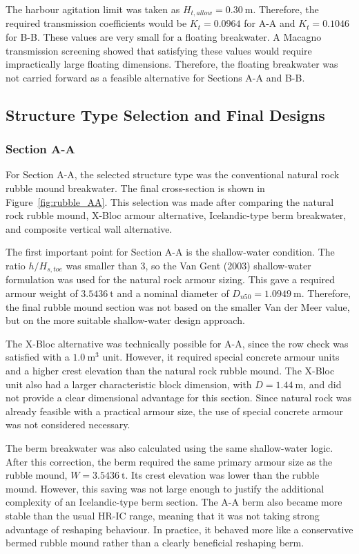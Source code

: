\documentclass[a4paper, 11pt]{article}
\begin{document}
The harbour agitation limit was taken as \(H_{t,allow}=0.30~\mathrm{m}\). Therefore, the required transmission coefficients would be \(K_t=0.0964\) for A-A and \(K_t=0.1046\) for B-B. These values are very small for a floating breakwater. A Macagno transmission screening showed that satisfying these values would require impractically large floating dimensions. Therefore, the floating breakwater was not carried forward as a feasible alternative for Sections A-A and B-B.


\subsection{Structure Type Selection and Final Designs}

\subsubsection{Section A-A}

\hspace*{0.5cm} For Section A-A, the selected structure type was the conventional natural rock rubble mound breakwater. The final cross-section is shown in Figure~\ref{fig:rubble_AA}. This selection was made after comparing the natural rock rubble mound, X-Bloc armour alternative, Icelandic-type berm breakwater, and composite vertical wall alternative.

The first important point for Section A-A is the shallow-water condition. The ratio \(h/H_{s,toe}\) was smaller than 3, so the Van Gent (2003) shallow-water formulation was used for the natural rock armour sizing. This gave a required armour weight of \(3.5436~\mathrm{t}\) and a nominal diameter of \(D_{n50}=1.0949~\mathrm{m}\). Therefore, the final rubble mound section was not based on the smaller Van der Meer value, but on the more suitable shallow-water design approach.

The X-Bloc alternative was technically possible for A-A, since the row check was satisfied with a \(1.0~\mathrm{m^3}\) unit. However, it required special concrete armour units and a higher crest elevation than the natural rock rubble mound. The X-Bloc unit also had a larger characteristic block dimension, with \(D=1.44~\mathrm{m}\), and did not provide a clear dimensional advantage for this section. Since natural rock was already feasible with a practical armour size, the use of special concrete armour was not considered necessary.

The berm breakwater was also calculated using the same shallow-water logic. After this correction, the berm required the same primary armour size as the rubble mound, \(W=3.5436~\mathrm{t}\). Its crest elevation was lower than the rubble mound. However, this saving was not large enough to justify the additional complexity of an Icelandic-type berm section. The A-A berm also became more stable than the usual HR-IC range, meaning that it was not taking strong advantage of reshaping behaviour. In practice, it behaved more like a conservative bermed rubble mound rather than a clearly beneficial reshaping berm.
\end{document}
